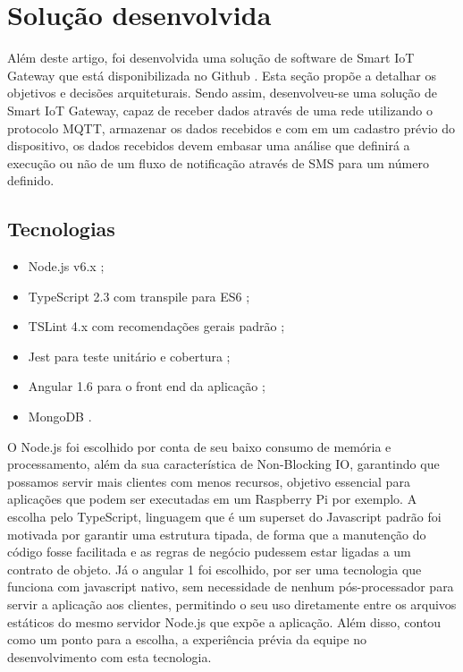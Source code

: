 \section{Solução desenvolvida}
\label{sec:iotGateway}

Além deste artigo, foi desenvolvida uma solução de software de Smart IoT Gateway que está disponibilizada no Github \cite{IoTGatewayGithub}. Esta seção propõe a detalhar os objetivos e decisões arquiteturais. Sendo assim, desenvolveu-se uma solução de Smart IoT Gateway, capaz de receber dados através de uma rede utilizando o protocolo MQTT, armazenar os dados recebidos e com em um cadastro prévio do dispositivo, os dados recebidos devem embasar uma análise que definirá a execução ou não  de um fluxo de notificação através de SMS para um número definido.

\subsection{Tecnologias} 
\begin{itemize}
	\item Node.js v6.x \cite{NodeJS};
	\item TypeScript 2.3 com transpile para ES6 \cite{Typescript};
	\item TSLint 4.x com recomendações gerais padrão \cite{TSLint};
	\item Jest para teste unitário e cobertura \cite{Jest};
	\item Angular 1.6 para o front end da aplicação \cite{AngularJS};
	\item MongoDB \cite{MongoDB}.
\end{itemize}

O Node.js foi escolhido por conta de seu baixo consumo de memória e processamento, além da sua característica de Non-Blocking IO, garantindo que possamos servir mais clientes com menos recursos, objetivo essencial para aplicações que podem ser executadas em um Raspberry Pi por exemplo. A escolha pelo TypeScript, linguagem que é um superset do Javascript padrão foi motivada por garantir uma estrutura tipada, de forma que a manutenção do código fosse facilitada e as regras de negócio pudessem estar ligadas a um contrato de objeto. Já o angular 1 foi escolhido, por ser uma tecnologia que funciona com javascript nativo, sem necessidade de nenhum pós-processador para servir a aplicação aos clientes, permitindo o seu uso diretamente entre os arquivos estáticos do mesmo servidor Node.js que expõe a aplicação. Além disso, contou como um ponto para a escolha, a experiência prévia da equipe no desenvolvimento com esta tecnologia.

